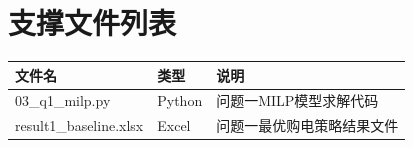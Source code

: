 \documentclass[12pt,a4paper]{ctexart}
\theoremstyle{definition}
\theoremstyle{plain}
\theoremstyle{remark}
\begin{document}
\section{支撑文件列表}

\begin{table}[H]
\centering
{}
\begin{tabular}{lll}
\toprule
文件名 & 类型 & 说明 \\
\midrule
03\_q1\_milp.py & Python & 问题一MILP模型求解代码 \\
result1\_baseline.xlsx & Excel & 问题一最优购电策略结果文件 \\
\bottomrule
\end{tabular}
\end{table}
\end{document}
